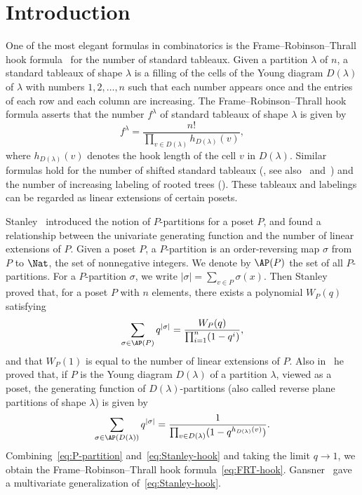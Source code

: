 \section{%
Introduction
}

One of the most elegant formulas in combinatorics is the Frame--Robinson--Thrall hook formula~\cite[Theorem~1]{FRT} for the number of standard tableaux.
Given a partition $\lambda$ of $n$, 
a standard tableaux of shape $\lambda$ is a filling of the cells of 
the Young diagram $D(\lambda)$ of $\lambda$ with numbers $1, 2, \dots, n$ 
such that each number appears once and the entries of each row and each column are increasing.
The Frame--Robinson--Thrall hook formula asserts that the number $f^\lambda$ of 
standard tableaux of shape $\lambda$ is given by
\begin{equation}
\label{eq:FRT-hook}
f^\lambda
 =
\frac{ n! }
 { \prod_{v \in D(\lambda)} h_{D(\lambda)}(v) },
\end{equation}
where $h_{D(\lambda)}(v)$ denotes the hook length of the cell $v$ in $D(\lambda)$.
Similar formulas hold for the number of shifted standard tableaux 
(\cite[5.1.4, Exercise~21]{Knu}, see also~\cite[\S~40]{Schur} and~\cite[Theorem~1]{T}) 
and the number of increasing labeling of rooted trees (\cite[5.1.4, Exercise~20]{Knu}).
These tableaux and labelings can be regarded as linear extensions of certain posets.

Stanley~\cite{Stan1} introduced the notion of $P$-partitions for a poset $P$, 
and found a relationship between the univariate generating function 
and the number of linear extensions of $P$.
Given a poset $P$, a $P$-partition is an order-reversing map $\sigma$ from $P$ to $\Nat$, 
the set of nonnegative integers.
We denote by $\AP(P)$ the set of all $P$-partitions.
For a $P$-partition $\sigma$, we write $|\sigma| = \sum_{v \in P} \sigma(x)$.
Then Stanley~\cite[Corollaries~5.3 and~5.4]{Stan1} proved that, for a poset $P$ with $n$ elements, 
there exists a polynomial $W_P(q)$ satisfying
\begin{equation}
\label{eq:P-partition}
\sum_{\sigma \in \AP(P)} q^{|\sigma|}
 =
\frac{ W_P(q) }
 { \prod_{i=1}^n (1 - q^i) },
\end{equation}
and that $W_P(1)$ is equal to the number of linear extensions of $P$.
Also in~\cite[Proposition~18.3]{Stan2} he proved that, 
if $P$ is the Young diagram $D(\lambda)$ of a partition $\lambda$, viewed as a poset, 
the generating function of $D(\lambda)$-partitions (also called reverse plane partitions of shape $\lambda$) 
is given by
\begin{equation}
\label{eq:Stanley-hook}
\sum_{\sigma \in \AP(D(\lambda))} q^{|\sigma|}
 =
\frac{ 1 }
 { \prod_{v \in D(\lambda)} (1 - q^{h_{D(\lambda)}(v)}) }.
\end{equation}
Combining~\eqref{eq:P-partition} and~\eqref{eq:Stanley-hook} and taking the limit $q \to 1$, 
we obtain the Frame--Robinson--Thrall hook formula~\eqref{eq:FRT-hook}.
Gansner~\cite[Theorem~5.1]{G} gave a multivariate generalization of~\eqref{eq:Stanley-hook}.

